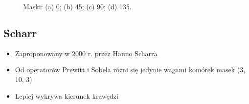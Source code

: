\documentclass[a4paper,twocolumn,12pt]{article}
\begin{document}
\begin{figure}[!ht]
 \begin{center}
 \end{center}
 \caption{
  Maski:
  (a) 0\textdegree;
  (b) 45\textdegree;
  (c) 90\textdegree;
  (d) 135\textdegree.
 }
 \label{fig:sobel_matrices}
\end{figure}


\subsection{Scharr}

\begin{itemize}
 \item Zaproponowany w 2000 r. przez Hanno Scharra
 \item Od operatorów Prewitt i Sobela różni się jedynie wagami komórek masek (3, 10, 3)
 \item Lepiej wykrywa kierunek krawędzi
\end{itemize}
\end{document}
